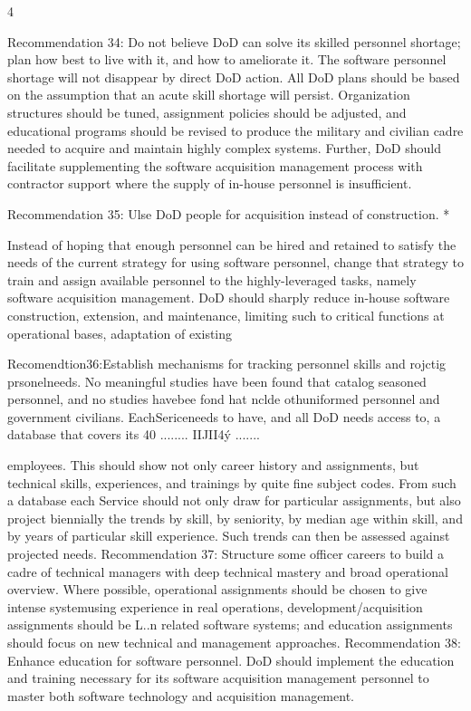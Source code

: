 \documentclass[12pt]{article}
\begin{document}
4

Recommendation 34: Do not believe DoD can solve its skilled personnel
shortage; plan how best to live with it, and how to ameliorate it.
The software personnel shortage will not disappear by direct DoD action. All DoD
plans should be based on the assumption that an acute skill shortage will persist.
Organization structures should be tuned, assignment policies should be adjusted, and
educational programs should be revised to produce the military and civilian cadre needed
to acquire and maintain highly complex systems.
Further, DoD should facilitate supplementing the software acquisition management
process with contractor support where the supply of in-house personnel is insufficient.

Recommendation 35: Ulse DoD people for acquisition instead of construction.
*

Instead of hoping that enough personnel can be hired and retained to satisfy the
needs of the current strategy for using software personnel, change that strategy to train
and assign available personnel to the highly-leveraged tasks, namely software acquisition
management. DoD should sharply reduce in-house software construction, extension, and
maintenance, limiting such to critical functions at operational bases, adaptation of existing

Recomendtion36:Establish mechanisms for tracking personnel skills
and rojctig prsonelneeds.
No meaningful studies have been found that catalog seasoned personnel, and no studies
havebee
fond hat nclde othuniformed personnel and government civilians.
EachSericeneeds to have, and all DoD needs access to, a database that covers its
40
........ IIJII4ý
.......

employees. This should show not only career history and assignments, but technical skills,
experiences, and trainings by quite fine subject codes.
From such a database each Service should not only draw for particular assignments,
but also project biennially the trends by skill, by seniority, by median age within skill, and
by years of particular skill experience. Such trends can then be assessed against projected
needs.
Recommendation 37: Structure some officer careers to build a cadre
of technical managers with deep technical mastery and broad operational
overview.
Where possible, operational assignments should be chosen to give intense systemusing experience in real operations, development/acquisition assignments should be L..n
related software systems; and education assignments should focus on new technical and
management approaches.
Recommendation 38: Enhance education for software personnel.
DoD should implement the education and training necessary for its software acquisition
management personnel to master both software technology and acquisition management.
\end{document}
